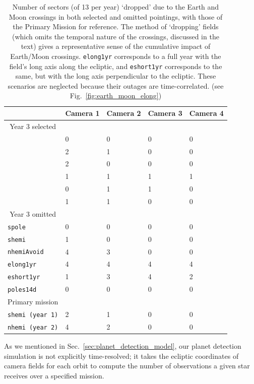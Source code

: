 \begin{table}[!t]
	\centering
	\begin{tabular}{ | l | l | l | l | l | }
		\hline
		\ & Camera 1 & Camera 2 & Camera 3 & Camera 4 \\ \hline
		\multicolumn{1}{|c|}{Year 3 selected} & \  & \  & \  & \  \\ \hline
		\npole & 0 & 0 & 0 & 0 \\ \hline
		\nhemi & 2 & 1 & 0 & 0 \\ \hline
		\shemiAvoid & 2 & 0 & 0 & 0 \\ \hline
		\elong & 1 & 1 & 1 & 1 \\ \hline
		\eshort & 0 & 1 & 1 & 0 \\ \hline
		\hemis & 1 & 1 & 0 & 0 \\ \hline
		\multicolumn{1}{|c|}{Year 3 omitted} & \  & \  & \  & \  \\ \hline
		\texttt{spole}  & 0 & 0 & 0 & 0 \\ \hline
		\texttt{shemi} & 1 & 0 & 0 & 0 \\ \hline
		\texttt{nhemiAvoid} & 4 & 3 & 0 & 0 \\ \hline
		\texttt{elong1yr} & 4 & 4 & 4 & 4 \\ \hline
		\texttt{eshort1yr} & 1 & 3 & 4 & 2 \\ \hline
		\texttt{poles14d} & 0 & 0 & 0 & 0 \\ \hline
		\multicolumn{1}{|c|}{Primary mission} & \  & \  & \  & \  \\ \hline
		\texttt{shemi (year 1)} & 2 & 1 & 0 & 0 \\ \hline
		\texttt{nhemi (year 2)} & 4 & 2 & 0 & 0 \\ \hline
	\end{tabular}
	\caption{Number of sectors (of 13 per year) `dropped' due to the Earth and Moon crossings in both selected and omitted pointings, with those of the Primary Mission for reference. The method of `dropping' fields (which omits the temporal nature of the crossings, discussed in the text) gives a representative sense of the cumulative impact of Earth/Moon crossings. \texttt{elong1yr} corresponds to a full year with the \tess field's long axis along the ecliptic, and \texttt{eshort1yr} corresponds to the same, but with the long axis perpendicular to the ecliptic. These scenarios are neglected because their outages are time-correlated. (see Fig.~\protect\ref{fig:earth_moon_elong})}
	\label{tab:dropped_fields}
\end{table}
As we mentioned in Sec.~\ref{sec:planet_detection_model}, our planet detection simulation is not explicitly time-resolved; it takes the ecliptic coordinates of camera fields for each orbit to compute the number of observations a given star receives over a specified mission.
